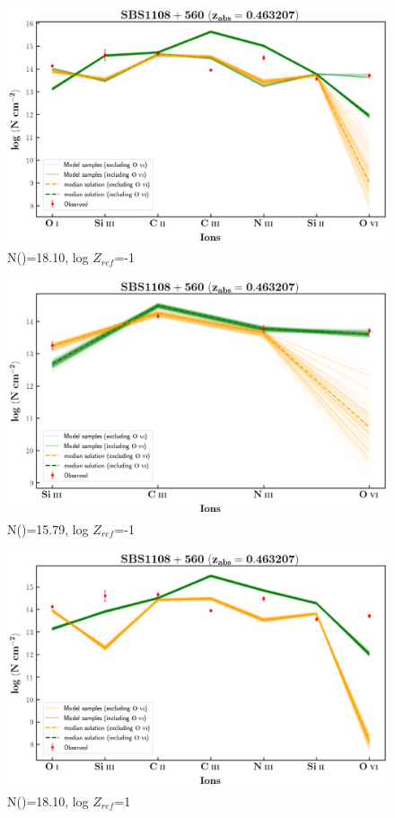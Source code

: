 \documentclass[12pt]{report}
\newcommand\ion[2]{\text{#1\,\textsc{\lowercase{#2}}}}
\begin{document}
\begin{figure}[!h]
    \centering
    \includegraphics[width=0.85\linewidth]{Ionisation-Modelling-Plots/sbs1108-z=0.463207-compIII_logZ=-1.png}
    \caption{N(\ion{H}{i})=18.10, log $Z_{ref}$=-1}
\end{figure}


\begin{figure}[!b]
    \centering
    \includegraphics[width=0.85\linewidth]{Ionisation-Modelling-Plots/sbs1108-z=0.463207-compII_logZ=-1.png}
    \caption{N(\ion{H}{i})=15.79, log $Z_{ref}$=-1}
\end{figure}

\newpage

\begin{figure}[!h]
    \centering
    \includegraphics[width=0.85\linewidth]{Ionisation-Modelling-Plots/sbs1108-z=0.463207-compIII_logZ=1.png}
    \caption{N(\ion{H}{i})=18.10, log $Z_{ref}$=1}
\end{figure}
\end{document}
